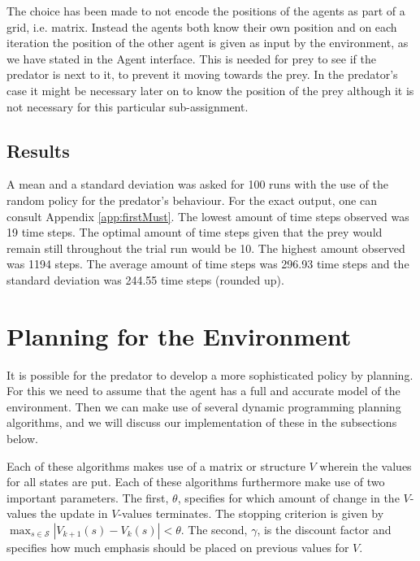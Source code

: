 \documentclass{article}
\begin{document}
The choice has been made to not encode the positions of the agents as part of a grid, i.e. matrix. Instead the agents both know their own position and on each iteration the position of the other agent is given as input by the environment, as we have stated in the Agent interface. This is needed for prey to see if the predator is next to it, to prevent it moving towards the prey. In the predator's case it might be necessary later on to know the position of the prey although it is not necessary for this particular sub-assignment.

\subsection{Results}
A mean and a standard deviation was asked for 100 runs with the use of the random policy for the predator's behaviour. For the exact output, one can consult Appendix \ref{app:firstMust}. The lowest amount of time steps observed was 19 time steps. The optimal amount of time steps given that the prey would remain still throughout the trial run would be 10. The highest amount observed was 1194 steps. The average amount of time steps was 296.93 time steps and the standard deviation was 244.55 time steps (rounded up). %


\section{Planning for the Environment}
It is possible for the predator to develop a more sophisticated policy by planning. For this we need to assume that the agent has a full and accurate model of the environment. Then we can make use of several dynamic programming planning algorithms, and we will discuss our implementation of these in the subsections below.

Each of these algorithms makes use of a matrix or structure $V$ wherein the values for all states are put. Each of these algorithms furthermore make use of two important parameters. The first, $\theta$, specifies for which amount of change in the $V$-values the update in $V$-values terminates. The stopping criterion is given by  $\max_{s \in \mathcal S} | V_{ k+1}(s) - V_{k}(s) | < \theta$.
The second, $\gamma$, is the discount factor and specifies how much emphasis should be placed on previous values for $V$.
\end{document}
